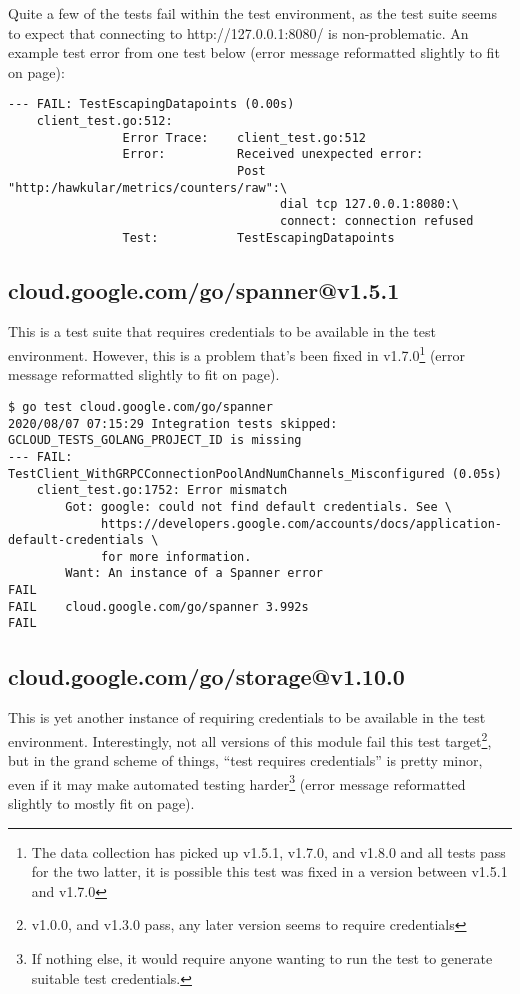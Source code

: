 \documentclass[a4paper]{paper}
\begin{document}
Quite a few of the tests fail within the test environment, as the test suite seems to expect that connecting to http://127.0.0.1:8080/ is non-problematic. An example test error from one test below (error message reformatted slightly to fit on page):

\begin{verbatim}
--- FAIL: TestEscapingDatapoints (0.00s)
    client_test.go:512: 
                Error Trace:	client_test.go:512
                Error:      	Received unexpected error:
                            	Post "http:/hawkular/metrics/counters/raw":\
                                      dial tcp 127.0.0.1:8080:\
                                      connect: connection refused
                Test:       	TestEscapingDatapoints
\end{verbatim}

\subsection{cloud.google.com/go/spanner@v1.5.1}

This is a test suite that requires credentials to be available in the
test environment. However, this is a problem that's been fixed in
v1.7.0\footnote{The data collection has picked up v1.5.1, v1.7.0, and
  v1.8.0 and all tests pass for the two latter, it is possible this
  test was fixed in a version between v1.5.1 and v1.7.0} (error message reformatted slightly to fit on page).

\begin{verbatim}
$ go test cloud.google.com/go/spanner
2020/08/07 07:15:29 Integration tests skipped: GCLOUD_TESTS_GOLANG_PROJECT_ID is missing
--- FAIL: TestClient_WithGRPCConnectionPoolAndNumChannels_Misconfigured (0.05s)
    client_test.go:1752: Error mismatch
        Got: google: could not find default credentials. See \
             https://developers.google.com/accounts/docs/application-default-credentials \
             for more information.
        Want: An instance of a Spanner error
FAIL
FAIL	cloud.google.com/go/spanner	3.992s
FAIL
\end{verbatim}

\subsection{cloud.google.com/go/storage@v1.10.0}

This is yet another instance of requiring credentials to be available
in the test environment. Interestingly, not all versions of this
module fail this test target\footnote{v1.0.0, and v1.3.0 pass, any
  later version seems to require credentials}, but in the grand scheme
of things, ``test requires credentials'' is pretty minor, even if it
may make automated testing harder\footnote{If nothing else, it would
  require anyone wanting to run the test to generate suitable test
  credentials.} (error message reformatted slightly to mostly fit on page).
\end{document}
